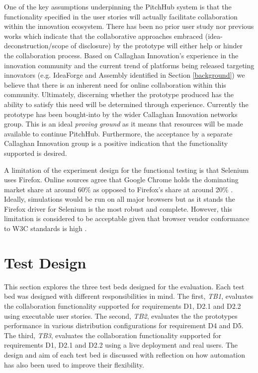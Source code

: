 One of the key assumptions underpinning the PitchHub system is that the functionality specified in the user stories will actually facilitate collaboration within the innovation ecosystem. There has been no prior user study nor previous works which indicate that the collaborative approaches embraced (idea-deconstruction/scope of disclosure) by the prototype will either help or hinder the collaboration process. Based on Callaghan Innovation's experience in the innovation community and the current trend of platforms being released targeting innovators (e.g. IdeaForge and Assembly identified in Section \ref{background}) we believe that there is an inherent need for online collaboration within this community. Ultimately, discerning whether the prototype produced has the ability to satisfy this need will be determined through experience. Currently the prototype has been bought-into by the wider Callaghan Innovation networks group. This is an ideal \textit{proving ground} as it means that resources will be made available to continue PitchHub. Furthermore, the acceptance by a separate Callaghan Innovation group is a positive indication that the functionality supported is desired.

A limitation of the experiment design for the functional testing is that Selenium uses Firefox. Online sources agree that Google Chrome holds the dominating market share at around 60\% as opposed to Firefox's share at around 20\% \cite{Brows6:online}. Ideally, simulations would be run on all major browsers but as it stands the Firefox driver for Selenium is the most robust and complete. However, this limitation is considered to be acceptable given that browser vendor conformance to W3C standards is high \cite{WebB1:online}.

\section{Test Design}
This section explores the three test beds designed for the evaluation. Each test bed was designed with different responsibilities in mind. The first, \textit{TB1}, evaluates the collaboration functionality supported for requirements D1, D2.1 and D2.2 using executable user stories. The second, \textit{TB2}, evaluates the the prototypes performance in various distribution configurations for requirement D4 and D5. The third, \textit{TB3}, evaluates the collaboration functionality supported for requirements D1, D2.1 and D2.2 using a live deployment and real users. The design and aim of each test bed is discussed with reflection on how automation has also been used to improve their flexibility.


